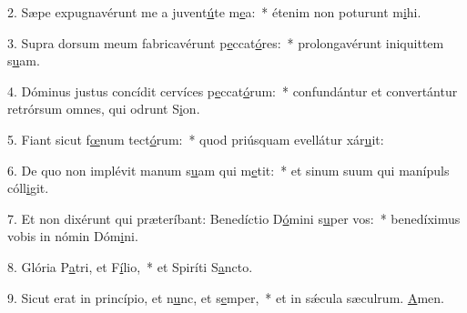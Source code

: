 2. Sæpe expugnavérunt me a juvent\uline{ú}te m\uline{e}a:~* étenim non poturunt m\uline{i}hi.\par 
3. Supra dorsum meum fabricavérunt p\uline{e}ccat\uline{ó}res:~* prolongavérunt iniquittem s\uline{u}am.\par 
4. Dóminus justus concídit cervíces p\uline{e}ccat\uline{ó}rum:~* confundántur et convertántur retrórsum omnes, qui odrunt S\uline{i}on.\par 
5. Fiant sicut f\uline{œ}num tect\uline{ó}rum:~* quod priúsquam evellátur xár\uline{u}it:\par 
6. De quo non implévit manum s\uline{u}am qui m\uline{e}tit:~* et sinum suum qui manípuls cóll\uline{i}git.\par 
7. Et non dixérunt qui præteríbant: Benedíctio D\uline{ó}mini s\uline{u}per vos:~* benedíximus vobis in nómin Dóm\uline{i}ni.\par 
8. Glória P\uline{a}tri, et F\uline{í}lio,~* et Spiríti S\uline{a}ncto.\par 
9. Sicut erat in princípio, et n\uline{u}nc, et s\uline{e}mper,~* et in sǽcula sæculrum. \uline{A}men.\par 
